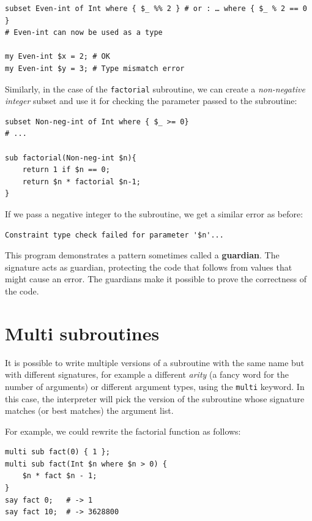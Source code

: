 \begin{verbatim}
subset Even-int of Int where { $_ %% 2 } # or : … where { $_ % 2 == 0 }
# Even-int can now be used as a type

my Even-int $x = 2; # OK
my Even-int $y = 3; # Type mismatch error
\end{verbatim}

Similarly, in the case of the {\tt factorial} subroutine, we 
can create a \emph{non-negative integer} subset and use it 
for checking the parameter passed to the subroutine:

\begin{verbatim}
subset Non-neg-int of Int where { $_ >= 0}
# ...

sub factorial(Non-neg-int $n){
    return 1 if $n == 0;
    return $n * factorial $n-1;
}
\end{verbatim}
%
If we pass a negative integer to the subroutine, we get 
a similar error as before:

\begin{verbatim}
Constraint type check failed for parameter '$n'...
\end{verbatim}

This program demonstrates a pattern sometimes called a {\bf guardian}.
The signature acts as guardian, protecting the code that
follows from values that might cause an error.  The guardians make it
possible to prove the correctness of the code.


\section{Multi subroutines}
\label{multisubs}

It is possible to write multiple versions of a subroutine 
with the same name but with different signatures, for example  
a different \emph{arity} (a fancy word for the number of 
arguments) or different argument types, using the 
{\tt multi} keyword. In this case, the interpreter will 
pick the version of the subroutine whose signature 
matches (or best matches) the argument list.

For example, we could rewrite the factorial function 
as follows:

\begin{verbatim}
multi sub fact(0) { 1 };
multi sub fact(Int $n where $n > 0) {
    $n * fact $n - 1;
}
say fact 0;   # -> 1
say fact 10;  # -> 3628800
\end{verbatim}

